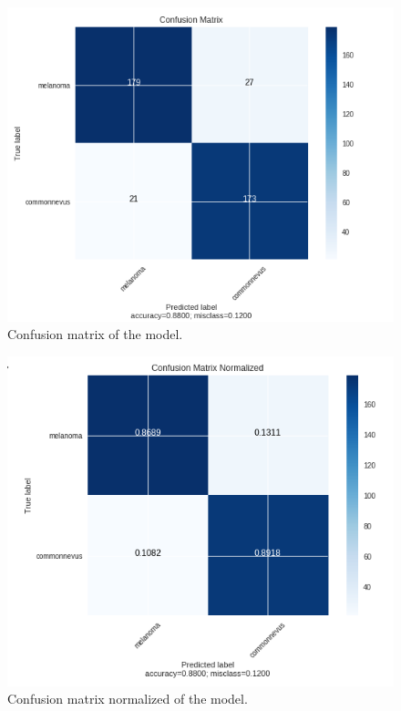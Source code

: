 \begin{figure}[H]
\centering
\includegraphics[width=1\textwidth]{./figures/confusion-matrix-resnet50}
\caption{Confusion matrix of the model.}
\end{figure}

\begin{figure}[H]
\centering
\includegraphics[width=1\textwidth]{./figures/confusion-matrix-normalized-resnet50}
\caption{Confusion matrix normalized of the model.}
\end{figure}

